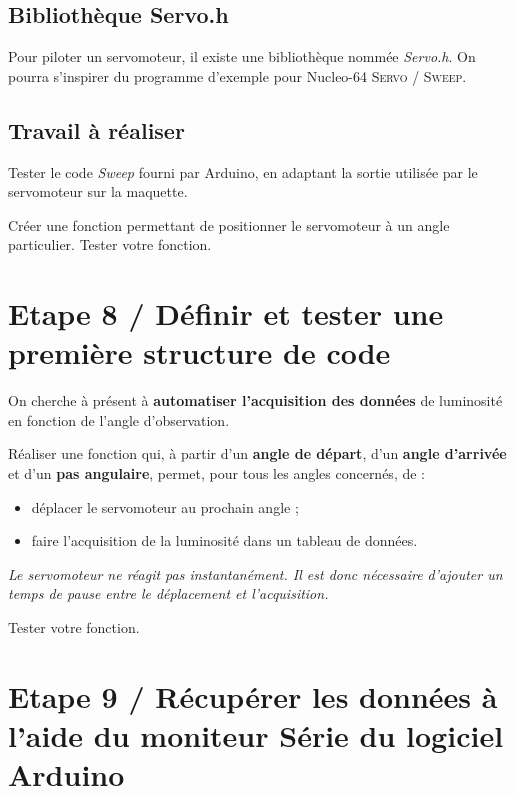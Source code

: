 \documentclass[a4paper,11pt,titlepage]{article} %
\begin{document}
\subsection{Bibliothèque Servo.h}

Pour piloter un servomoteur, il existe une bibliothèque nommée \textsl{Servo.h}. On pourra s'inspirer du programme d'exemple pour Nucleo-64 \textsc{Servo / Sweep}.


\subsection{Travail à réaliser}

\Manip Tester le code \textsl{Sweep} fourni par Arduino, en adaptant la sortie utilisée par le servomoteur sur la maquette.

\Manip Créer une fonction permettant de positionner le servomoteur à un angle particulier. Tester votre fonction. 


\section{Etape 8 / Définir et tester une première structure de code}

On cherche à présent à \textbf{automatiser l'acquisition des données} de luminosité en fonction de l'angle d'observation.

\Manip Réaliser une fonction qui, à partir d'un \textbf{angle de départ}, d'un \textbf{angle d'arrivée} et d'un \textbf{pas angulaire}, permet, pour tous les angles concernés, de :

\begin{itemize}
	\item déplacer le servomoteur au prochain angle ;
	\item faire l'acquisition de la luminosité dans un tableau de données.
\end{itemize}

\textit{Le servomoteur ne réagit pas instantanément. Il est donc nécessaire d'ajouter un temps de pause entre le déplacement et l'acquisition.}

\Manip Tester votre fonction.


\section{Etape 9 / Récupérer les données à l'aide du moniteur Série du logiciel Arduino}
\end{document}
